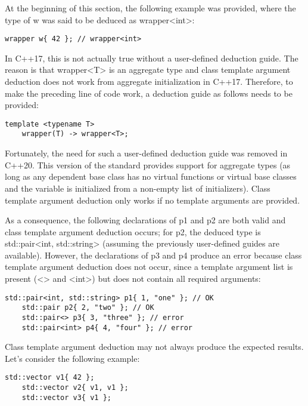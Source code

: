 At the beginning of this section, the following example was provided, where the type of w was said to be deduced as wrapper<int>:

\begin{lstlisting}[style=styleCXX]
	wrapper w{ 42 }; // wrapper<int>
\end{lstlisting}

In C++17, this is not actually true without a user-defined deduction guide. The reason is that wrapper<T> is an aggregate type and class template argument deduction does not work from aggregate initialization in C++17. Therefore, to make the preceding line of code work, a deduction guide as follows needs to be provided:

\begin{lstlisting}[style=styleCXX]
	template <typename T>
	wrapper(T) -> wrapper<T>;
\end{lstlisting}

Fortunately, the need for such a user-defined deduction guide was removed in C++20. This version of the standard provides support for aggregate types (as long as any dependent base class has no virtual functions or virtual base classes and the variable is initialized from a non-empty list of initializers).
Class template argument deduction only works if no template arguments are provided.

As a consequence, the following declarations of p1 and p2 are both valid and class template argument deduction occurs; for p2, the deduced type is std::pair<int, std::string> (assuming the previously user-defined guides are available). However, the declarations of p3 and p4 produce an error because class template argument deduction does not occur, since a template argument list is present (<> and <int>) but does not contain all required arguments:

\begin{lstlisting}[style=styleCXX]
	std::pair<int, std::string> p1{ 1, "one" }; // OK
	std::pair p2{ 2, "two" }; // OK
	std::pair<> p3{ 3, "three" }; // error
	std::pair<int> p4{ 4, "four" }; // error
\end{lstlisting}

Class template argument deduction may not always produce the expected results. Let’s consider the following example:

\begin{lstlisting}[style=styleCXX]
	std::vector v1{ 42 };
	std::vector v2{ v1, v1 };
	std::vector v3{ v1 };
\end{lstlisting}

